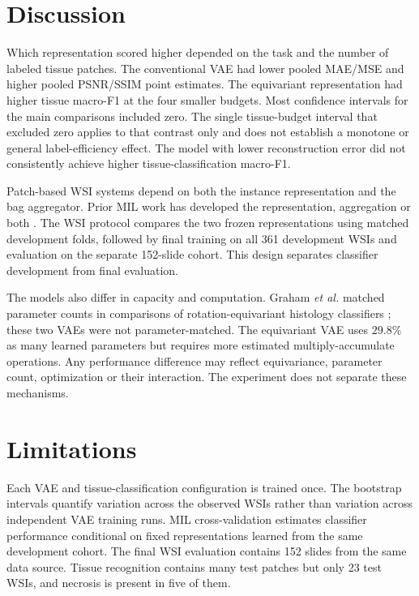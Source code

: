 \documentclass{midl}
\begin{document}
\section{Discussion}

Which representation scored higher depended on the task and the number of labeled tissue patches. The conventional VAE had lower pooled MAE/MSE and higher pooled PSNR/SSIM point estimates. The equivariant representation had higher tissue macro-F1 at the four smaller budgets. Most confidence intervals for the main comparisons included zero. The single tissue-budget interval that excluded zero applies to that contrast only and does not establish a monotone or general label-efficiency effect. The model with lower reconstruction error did not consistently achieve higher tissue-classification macro-F1.

Patch-based WSI systems depend on both the instance representation and the bag aggregator. Prior MIL work has developed the representation, aggregation or both \cite{ilse_attention_2018,lu_data_2021,li_dualstream_2021,shao_transmil_2021}. The WSI protocol compares the two frozen representations using matched development folds, followed by final training on all 361 development WSIs and evaluation on the separate 152-slide cohort. This design separates classifier development from final evaluation.

The models also differ in capacity and computation. Graham \emph{et al.} matched parameter counts in comparisons of rotation-equivariant histology classifiers \cite{graham_dense_2020}; these two VAEs were not parameter-matched. The equivariant VAE uses $29.8\%$ as many learned parameters but requires more estimated multiply-accumulate operations. Any performance difference may reflect equivariance, parameter count, optimization or their interaction. The experiment does not separate these mechanisms.

\section{Limitations}


Each VAE and tissue-classification configuration is trained once. The bootstrap intervals quantify variation across the observed WSIs rather than variation across independent VAE training runs. MIL cross-validation estimates classifier performance conditional on fixed representations learned from the same development cohort. The final WSI evaluation contains 152 slides from the same data source. Tissue recognition contains many test patches but only 23 test WSIs, and necrosis is present in five of them.
\end{document}
